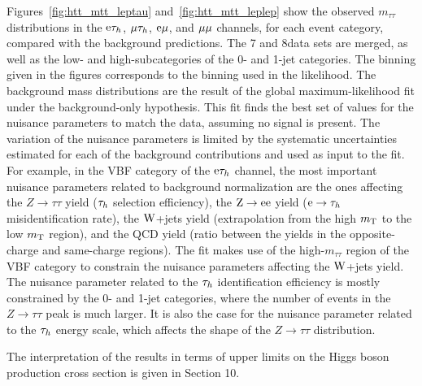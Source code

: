 \documentclass[12pt,twoside,a4paper,cmspaper,final,collab]{cms-tdr}
\begin{document}
Figures~\ref{fig:htt_mtt_leptau} and~\ref{fig:htt_mtt_leplep} show the observed  $m_{\tau\tau}$ distributions in the $\mathrm{e}\tau_h$, ${\mu}\tau_h$, $\mathrm{e}{\mu}$, and ${\mu}{\mu}$ channels, for each event category, compared with the background predictions.
The  7 and 8\TeV data sets are merged, as well as the low- and high-\PT subcategories of the 0- and 1-jet categories.
The binning given in the figures corresponds to the binning used in the likelihood.
The background mass distributions are the result of the global maximum-likelihood fit under the background-only hypothesis.
This fit finds the best set of values for the nuisance parameters to match the data,
assuming no signal is present.
The variation of the nuisance parameters is limited by the systematic uncertainties estimated for each of the background contributions and used as input to the fit.
For example, in the VBF category of the $\mathrm{e}\tau_h$ channel,
the most important nuisance parameters related to background normalization are the ones affecting
the $Z\to \tau \tau$ yield ($\tau_h$ selection efficiency),
the $\mathrm{Z}\to \mathrm{e}\mathrm{e}$ yield ($\mathrm{e} \to \tau_h$ misidentification rate),
the $\mathrm{W}$+jets yield (extrapolation from the high $m_\mathrm{T}$ to the low $m_\mathrm{T}$ region),
and the QCD yield (ratio between the yields in the opposite-charge and same-charge regions).
The fit makes use of the high-$m_{\tau\tau}$ region of the VBF category to constrain the nuisance parameters affecting the $\mathrm{W}$+jets yield.
The nuisance parameter related to the $\tau_h$ identification efficiency is mostly constrained by the 0- and 1-jet categories,
where the number of events in the $Z\to \tau\tau$ peak is much larger.
It is also the case for the nuisance parameter related to the $\tau_h$ energy scale, which affects the shape of the $Z\to \tau \tau$ distribution.

The interpretation of the results in terms of upper limits on the Higgs boson production cross section is given in Section 10.
\end{document}
